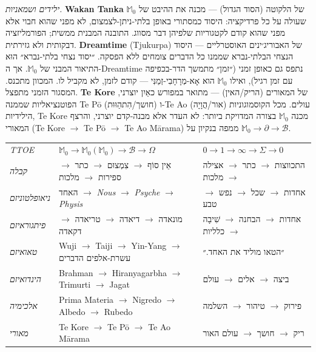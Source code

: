 \documentclass[10pt, openany, oneside]{book}
\renewcommand{\footnotesize}{\fontsize{8.5}{11}\selectfont}
\begin{document}
\textit{ילידים ושמאניות.} \textbf{Wakan Tanka} של הלקוטה (הסוד הגדול) — מכנה את ההיבט של $\mathbb{M}_0$ שעולה על כל פרדיקציה: היסוד כמסתורי באופן בלתי-ניתן-לצמצום, לא מפני שהוא חבוי אלא מפני שהוא קודם לקטגוריות שלפיהן דבר מסווג. התובנה המבנית ממשית; הפורמליזציה דבקותית ולא גזירתית. \textbf{Dreamtime} (Tjukurpa) של האבוריג׳ינים האוסטרליים — היסוד הנצחי הבלתי-נברא שממנו כל הדברים צומחים ללא הפסקה. ״יסוד נצחי בלתי-נברא״ הוּא התיאור המבני של $\mathbb{M}_0$. אך ה-Dreamtime נתפס גם כאופן זמני (״זמן״ מתמשך הדר-בכפיפה עם זמן רגיל), ואילו $\mathbb{M}_0$ הוא אָא-מְרָחָבִי-זְמַנִּי — קודם לזמן, לא מקביל לו. המכוון מתכנס. המסגור הזמני מתפצל. \textbf{Te Kore} של המאורים (הריק/האין) — מתואר במפורש כאַיִן יוצרני, הפוטנציאליות שממנה Te Pō (חושך/הִתהַוּוּת) ו-Te Ao (אור/הֲוָיָה) עולים. מכל הקוסמוגוניות הילידיות, Te Kore מכנה $\mathbb{M}_0$ בצורה המדויקת ביותר: לא העדר אלא מבנה-קדם יוצרני, והרצף המאורי (Te Kore $\to$ Te Pō $\to$ Te Ao Mārama) ממפה בנקיון על $\mathbb{M}_0 \to \partial \to \mathcal{B}$.

\vspace{1em}

{\footnotesize
\noindent\begin{tabular}{l p{} p{}}
\textit{TTOE} & $\mathbb{M}_0 \to \mathbb{M}_0(\mathbb{M}_0) \to \mathcal{B} \to \Omega$ & $0 \to 1 \to \infty \to \Sigma \to 0$ \\[0.3em]
\textit{קבלה} & אֵין סוֹף $\to$ צִמְצוּם $\to$ כתר $\to$ ספירות $\to$ מלכות & התכווצות $\to$ כתר $\to$ אצילה $\to$ מלכות \\[0.3em]
\textit{ניאופלטוניזם} & האחד $\to$ \textit{Nous} $\to$ \textit{Psyche} $\to$ \textit{Physis} & אחדות $\to$ שכל $\to$ נפש $\to$ טבע \\[0.3em]
\textit{פיתגוראיזם} & מונאדה $\to$ דיאדה $\to$ טריאדה $\to$ דקאדה & אחדות $\to$ הבחנה $\to$ שִׁיבָה $\to$ כלליות \\[0.3em]
\textit{טאואיזם} & Wuji $\to$ Taiji $\to$ Yin-Yang $\to$ עשרת-אלפים הדברים & ״הטאו מוליד את האחד.״ \\[0.3em]
\textit{הינדואיזם} & Brahman $\to$ Hiranyagarbha $\to$ Trimurti $\to$ Jagat & ביצה $\to$ אלים $\to$ עולם \\[0.3em]
\textit{אלכימיה} & Prima Materia $\to$ Nigredo $\to$ Albedo $\to$ Rubedo & פירוק $\to$ טיהור $\to$ השלמה \\[0.3em]
\textit{מאורי} & Te Kore $\to$ Te P\={o} $\to$ Te Ao M\={a}rama & ריק $\to$ חושך $\to$ עולם האור \\[0.3em]
\end{tabular}
}
\end{document}
